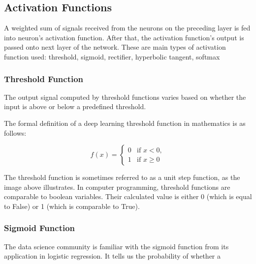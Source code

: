  
\subsection*{Activation Functions}
A weighted sum of signals received from the neurons on the preceding layer is fed into neuron's activation function. After that, the activation function's output is passed onto next layer of the network.
These are main types of activation function used: threshold, sigmoid, rectifier, hyperbolic tangent, softmax


\subsubsection*{Threshold Function}
The output signal computed by threshold functions varies based on whether the input is above or below a predefined threshold. 

The formal definition of a deep learning threshold function in mathematics is as follows:

\begin{equation}
f(x) =
\begin{cases}
	0 & \text{if } x < 0,\\
	1 & \text{if } x \geq 0
\end{cases}
\end{equation}



\begin{figure}[htp]
	\centering
{}
\end{figure}


The threshold function is sometimes referred to as a unit step function, as the image above illustrates. In computer programming, threshold functions are comparable to boolean variables. Their calculated value is either 0 (which is equal to False) or 1 (which is comparable to True).


\subsubsection*{Sigmoid Function}
The data science community is familiar with the sigmoid function from its application in logistic regression. It tells us the probability of whether a 

